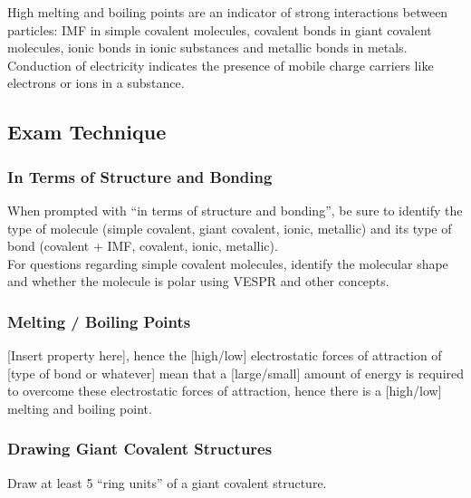 \documentclass[../main]{subfiles}
\begin{document}
	High melting and boiling points are an indicator of strong interactions between particles: IMF in simple covalent molecules, covalent bonds in giant covalent molecules, ionic bonds in ionic substances and metallic bonds in metals. \\

	Conduction of electricity indicates the presence of mobile charge carriers like electrons or ions in a substance.

	\subsection{Exam Technique}


	\subsubsection{In Terms of Structure and Bonding}

	When prompted with ``in terms of structure and bonding'', be sure to identify the type of molecule (simple covalent, giant covalent, ionic, metallic) and its type of bond (covalent + IMF, covalent, ionic, metallic). \\

	For questions regarding simple covalent molecules, identify the molecular shape and whether the molecule is polar using VESPR and other concepts.

	\subsubsection{Melting / Boiling Points}

	[Insert property here], hence the [high/low] electrostatic forces of attraction of [type of bond or whatever] mean that a [large/small] amount of energy is required to overcome these electrostatic forces of attraction, hence there is a [high/low] melting and boiling point.

	\subsubsection{Drawing Giant Covalent Structures}

	Draw at least 5 ``ring units'' of a giant covalent structure.
\end{document}
